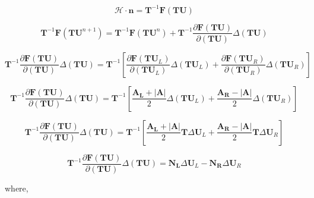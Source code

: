 \documentclass{article}
\begin{document}
\newcommand{\NL}{\mathbf{N_L}}
\newcommand{\NR}{\mathbf{N_R}}
\newcommand{\ML}{\mathbf{M_L}}
\newcommand{\MR}{\mathbf{M_R}}
\newcommand{\AL}{\mathbf{A_L}}
\newcommand{\AR}{\mathbf{A_R}}
\newcommand{\Aroe}{\lvert\mathbf{A}\rvert}
\newcommand{\rotmat}{\mathbf{T}}
\newcommand{\flux}{\mathbf{F}}
\newcommand{\cons}{\mathbf{U}}
\newcommand{\invrotmat}{\mathbf{T}^{-1}}

\begin{equation}
    \mathcal{H} \cdot \mathbf{n}
    =
    \invrotmat\flux(\rotmat\cons)
\end{equation}

\begin{equation}
    \invrotmat\flux(\rotmat\cons^{n+1})
    =
    \invrotmat\flux(\rotmat\cons^{n})
    +
    \invrotmat\frac{\partial\flux(\rotmat\cons)}{\partial(\rotmat\cons)}\Delta(\rotmat\cons)
\end{equation}

\begin{equation}
    \invrotmat\frac{\partial\flux(\rotmat\cons)}{\partial(\rotmat\cons)}\Delta(\rotmat\cons)
    =
    \invrotmat
    \left[
        \frac{\partial\flux(\rotmat\cons_L)}{\partial(\rotmat\cons_L)}\Delta(\rotmat\cons_L)
        +
        \frac{\partial\flux(\rotmat\cons_R)}{\partial(\rotmat\cons_R)}\Delta(\rotmat\cons_R)
    \right]
\end{equation}

\begin{equation}
    \invrotmat\frac{\partial\flux(\rotmat\cons)}{\partial(\rotmat\cons)}\Delta(\rotmat\cons)
    =
    \invrotmat
    \left[
        \frac{\AL + \Aroe}{2}\Delta(\rotmat\cons_L)
        +
        \frac{\AR - \Aroe}{2}\Delta(\rotmat\cons_R)
    \right]
\end{equation}

\begin{equation}
    \invrotmat\frac{\partial\flux(\rotmat\cons)}{\partial(\rotmat\cons)}\Delta(\rotmat\cons)
    =
    \invrotmat
    \left[
        \frac{\AL + \Aroe}{2}\rotmat\Delta\cons_L
        +
        \frac{\AR - \Aroe}{2}\rotmat\Delta\cons_R
    \right]
\end{equation}

\begin{equation}
    \invrotmat\frac{\partial\flux(\rotmat\cons)}{\partial(\rotmat\cons)}\Delta(\rotmat\cons)
    =
    \NL\Delta\cons_L
    -
    \NR\Delta\cons_R
\end{equation}

where, 
\end{document}
